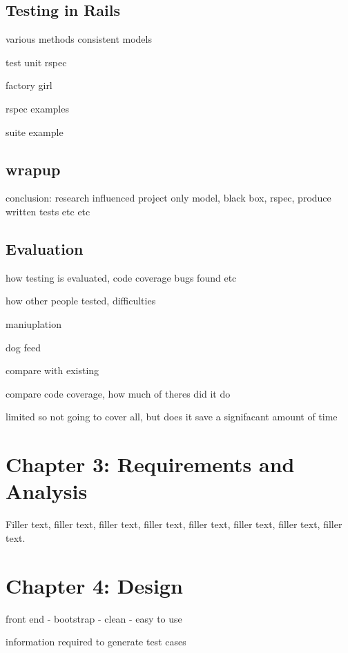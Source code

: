 \documentclass{article}
\begin{document}
\subsection{Testing in Rails}
\par various methods consistent models
\par test unit rspec
\par factory girl
\par rspec examples
\par suite example



\subsection{wrapup}
\par conclusion: research influenced project
	only model, black box, rspec, produce written tests etc etc

\subsection{Evaluation}
\par how testing is evaluated, code coverage bugs found etc
\par how other people tested, difficulties
\par maniuplation
\par dog feed
\par compare with existing
\par compare code coverage, how much of theres did it do
\par limited so not going to cover all, but does it save a signifacant amount of time



\section{Chapter 3: Requirements and Analysis}
Filler text, filler text, filler text, filler text, filler text, filler text, filler text, filler text.



\section{Chapter 4: Design}

\par front end - bootstrap - clean - easy to use

\par information required to generate test cases
\end{document}
